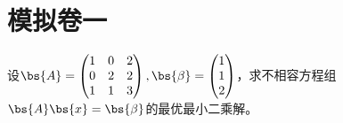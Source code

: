\documentclass[12pt, a4paper, oneside, UTF8]{ctexbook}
\begin{document}
\else
\fi

\chapter{模拟卷一}
\begin{question} 
   设$\bs{A}=\begin{pmatrix}
    1&0&2\\
    0&2&2\\
    1&1&3
   \end{pmatrix},\bs{\beta}=\begin{pmatrix}
    1\\
    1\\
    2
   \end{pmatrix}$，求不相容方程组$\bs{A}\bs{x}=\bs{\beta}$的最优最小二乘解。
\end{question}
\end{document}
